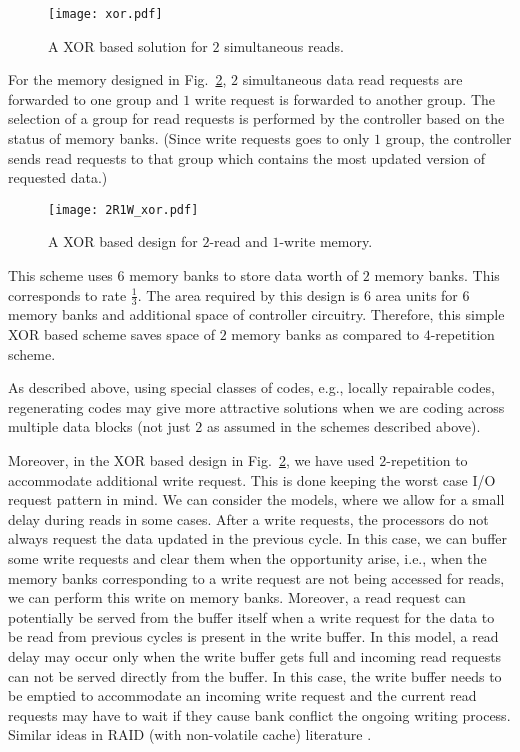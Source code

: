 \documentclass[11pt,letter]{article}
\begin{document}
\begin{figure}[htbp]
    \centering
    \texttt{[image: xor.pdf]}
    \caption{A XOR based solution for $2$ simultaneous reads.}
    \label{fig:XOR1}
\end{figure}


For the memory designed in Fig.~\ref{fig:XOR2}, $2$ simultaneous data read requests are forwarded to one group and $1$ write request is forwarded to another group. The selection of a group for read requests is performed by the controller based on the status of memory banks. (Since write requests goes to only $1$ group, the controller sends read requests to that group which contains the most updated version of requested data.)


\begin{figure}[htbp]
    \centering
    \texttt{[image: 2R1W\_xor.pdf]}
    \caption{A XOR based design for $2$-read and $1$-write memory.}
    \label{fig:XOR2}
\end{figure}

This scheme uses $6$ memory banks to store data worth of $2$ memory banks. This corresponds to rate $\frac{1}{3}$. The area required by this design is $6$ area units for $6$ memory banks and additional space of controller circuitry. Therefore, this simple XOR based scheme saves space of $2$ memory banks as compared to $4$-repetition scheme. 

As described above, using special classes of codes, e.g., locally repairable codes, regenerating codes may give more attractive solutions when we are coding across multiple data blocks (not just $2$ as assumed in the schemes described above).  

Moreover, in the XOR based design in Fig.~\ref{fig:XOR2}, we have used $2$-repetition to accommodate additional write request. This is done keeping the worst case I/O request pattern in mind. We can consider the models, where we allow for a small delay during reads in some cases. After a write requests, the processors do not always request the data updated in the previous cycle. In this case, we can buffer some write requests and clear them when the opportunity arise, i.e., when the memory banks corresponding to a write request are not being accessed for reads, we can perform this write on memory banks. Moreover, a read request can potentially be served from the buffer itself when a write request for the data to be read from previous cycles is present in the write buffer. In this model, a read delay may occur only when the write buffer gets full and incoming read requests can not be served directly from the buffer. In this case, the write buffer needs to be emptied to accommodate an incoming write request and the current read requests may have to wait if they cause bank conflict the ongoing writing process. Similar ideas in RAID (with non-volatile cache) literature \cite{wow2005, ThomLiu2005}. 
\end{document}
